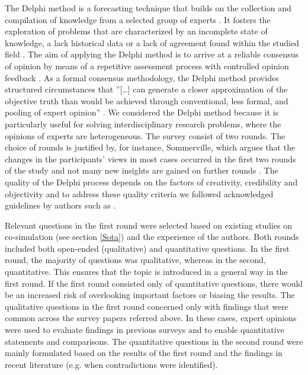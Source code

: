 The Delphi method is a forecasting technique that builds on the collection and compilation of knowledge from a selected group of experts \cite{Dalkey1963,Hsu2007}. It fosters the exploration of problems that are characterized by an incomplete state of knowledge\cite{Powell2003}, a lack historical data or a lack of agreement found within the studied field \cite{Okoli2004a}. 
The aim of applying the Delphi method is to arrive at a reliable consensus of opinion by means of a repetitive assessment process with controlled opinion feedback \cite{Landeta2006}. 
As a formal consensus methodology, the Delphi method provides structured circumstances that ''[\ldots] can generate a closer approximation of the objective truth than would be achieved through conventional, less formal, and pooling of expert opinion''  \cite{Balasubramanian2012}. 
We considered the Delphi method because it is particularly useful for solving interdisciplinary research problems, where the opinions of experts are heterogeneous.
The survey consist of two rounds. The choice of rounds is justified by, for instance, Sommerville, which argues that the changes in the participants’ views in most cases occurred in the first two rounds of the study and not many new insights are gained on further rounds \cite{Sommerville2008}.
The quality of the Delphi process depends on the factors of creativity, credibility and objectivity \cite{Nowack2011} and to address these quality criteria we followed acknowledged guidelines by authors such as \cite{Landeta2006,Nowack2011,Okoli2004a}.

Relevant questions in the first round were selected based on existing studies on co-simulation (see section \ref{Sota}) and the experience of the authors.
Both rounds included both open-ended (qualitative) and quantitative questions.
In the first round, the majority of questions was qualitative, whereas in the second, quantitative. 
This ensures that the topic is introduced in a general way in the first round. 
If the first round consisted only of quantitative questions, there would be an increased risk of overlooking important factors or biasing the results. 
The qualitative questions in the first round concerned only with findings that were common across the survey papers referred above. 
In these cases, expert opinions were used to evaluate findings in previous surveys and to enable quantitative statements and comparisons. 
The quantitative questions in the second round were mainly formulated based on the results of the first round and the findings in recent literature (e.g. when contradictions were identified).



